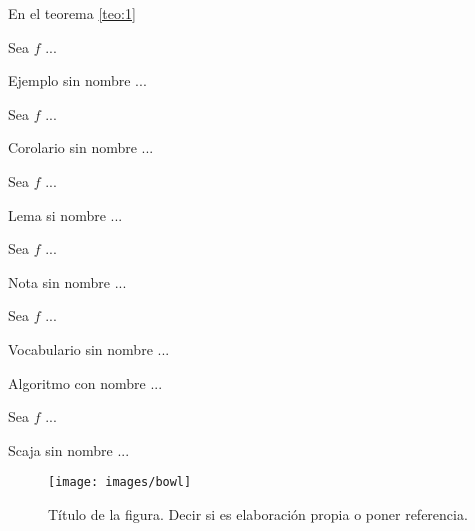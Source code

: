 \documentclass[fleqn]{Paquetes/RevDigMatEduInt}
\begin{document}
En el teorema \ref{teo:1}

\begin{ejemplo}
	Sea $f$ ...
\end{ejemplo}

\begin{ejemplo}
	Ejemplo sin nombre ...
\end{ejemplo}

\begin{corolario}
	Sea $f$ ...
\end{corolario}

\begin{corolario}
Corolario sin nombre ...
\end{corolario}

\begin{lema}
Sea $f$ ...
\end{lema}

\begin{lema}
Lema si nombre ...
\end{lema}

\begin{nota}
Sea $f$ ...
\end{nota}

\begin{nota}
Nota sin nombre ...
\end{nota}

\begin{vocabulario}
Sea $f$ ...
\end{vocabulario}

\begin{vocabulario}
Vocabulario sin nombre ...
\end{vocabulario}

\begin{algoritmo}
	Algoritmo con nombre ...
\end{algoritmo}


\begin{caja}
Sea $f$ ...
\end{caja}

\begin{scaja}
Scaja sin nombre ...
\end{scaja}


\begin{figure}[ht!!!]
	\centering
	\begin{minipage}{0.7\textwidth}
		\centering
		\texttt{[image: images/bowl]}
		\caption{Título de la figura. Decir si es elaboración propia o poner referencia.}
		\label{fig:nombre}
	\end{minipage}
\end{figure}
\end{document}
